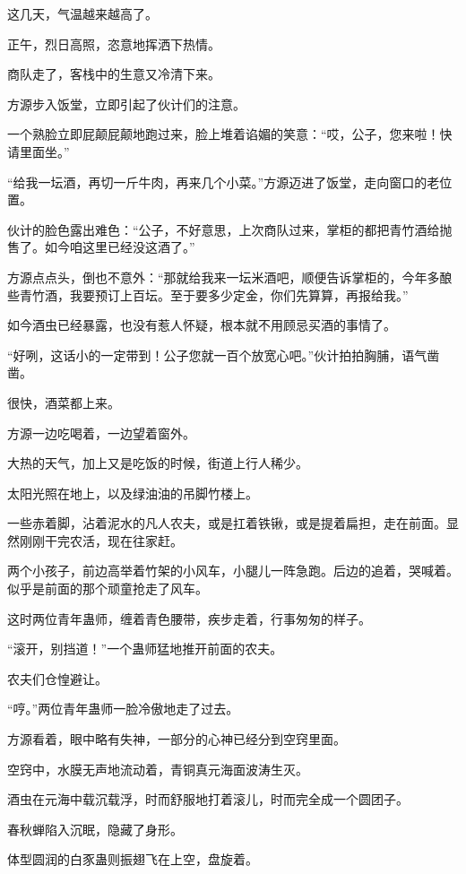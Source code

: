 
\begin{this_body}

这几天，气温越来越高了。

正午，烈日高照，恣意地挥洒下热情。

商队走了，客栈中的生意又冷清下来。

方源步入饭堂，立即引起了伙计们的注意。

一个熟脸立即屁颠屁颠地跑过来，脸上堆着谄媚的笑意：“哎，公子，您来啦！快请里面坐。”

“给我一坛酒，再切一斤牛肉，再来几个小菜。”方源迈进了饭堂，走向窗口的老位置。

伙计的脸色露出难色：“公子，不好意思，上次商队过来，掌柜的都把青竹酒给抛售了。如今咱这里已经没这酒了。”

方源点点头，倒也不意外：“那就给我来一坛米酒吧，顺便告诉掌柜的，今年多酿些青竹酒，我要预订上百坛。至于要多少定金，你们先算算，再报给我。”

如今酒虫已经暴露，也没有惹人怀疑，根本就不用顾忌买酒的事情了。

“好咧，这话小的一定带到！公子您就一百个放宽心吧。”伙计拍拍胸脯，语气凿凿。

很快，酒菜都上来。

方源一边吃喝着，一边望着窗外。

大热的天气，加上又是吃饭的时候，街道上行人稀少。

太阳光照在地上，以及绿油油的吊脚竹楼上。

一些赤着脚，沾着泥水的凡人农夫，或是扛着铁锹，或是提着扁担，走在前面。显然刚刚干完农活，现在往家赶。

两个小孩子，前边高举着竹架的小风车，小腿儿一阵急跑。后边的追着，哭喊着。似乎是前面的那个顽童抢走了风车。

这时两位青年蛊师，缠着青色腰带，疾步走着，行事匆匆的样子。

“滚开，别挡道！”一个蛊师猛地推开前面的农夫。

农夫们仓惶避让。

“哼。”两位青年蛊师一脸冷傲地走了过去。

方源看着，眼中略有失神，一部分的心神已经分到空窍里面。

空窍中，水膜无声地流动着，青铜真元海面波涛生灭。

酒虫在元海中载沉载浮，时而舒服地打着滚儿，时而完全成一个圆团子。

春秋蝉陷入沉眠，隐藏了身形。

体型圆润的白豕蛊则振翅飞在上空，盘旋着。


\end{this_body}
